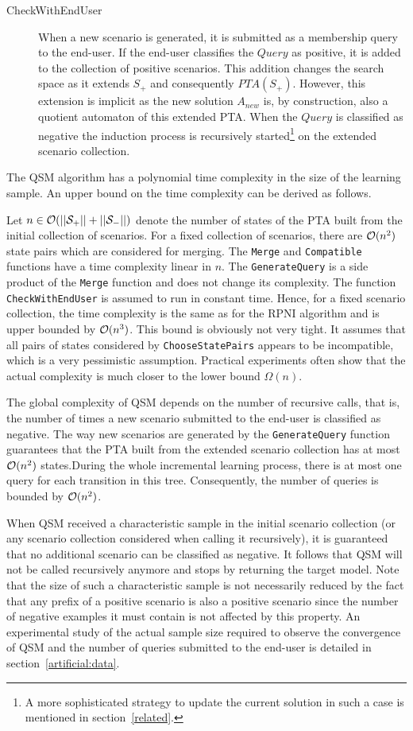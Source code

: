\begin{description}
\item[CheckWithEndUser] When a new scenario is generated, it is submitted as a membership query to the end-user. If the end-user classifies the $Query$ as positive, it is added to the collection of positive scenarios. This addition changes the search space as it extends $S_+$ and consequently $PTA(S_+)$. However, this extension is implicit as the new solution $A_{new}$ is, by construction, also a quotient automaton of this extended PTA. When the $Query$ is classified as negative the induction process is recursively started\footnote{A more sophisticated strategy to update the current solution in such a case is mentioned in section~\ref{related}.} on the extended scenario collection.
\end{description}

The QSM algorithm has a polynomial time complexity in the size of the learning sample. An upper bound on the time complexity can be derived as follows.

Let $n\in \cal{O}(||S_+||+||S_-||)$ denote the number of states of the PTA built from the initial collection of scenarios. For a fixed collection of scenarios, there are ${\cal O}(n^2)$ state pairs which are considered for merging. The \texttt{Merge} and \texttt{Compatible} functions have a time complexity linear in $n$. The \texttt{GenerateQuery} is a side product of the \texttt{Merge} function and does not change its complexity. The function \texttt{CheckWithEndUser} is assumed to run in constant time. Hence, for a fixed scenario collection, the time complexity is the same as for the RPNI algorithm and is upper bounded by ${\cal O}(n^3)$. This bound is obviously not very tight. It assumes that all pairs of states considered by \texttt{ChooseStatePairs} appears to be incompatible, which is a very pessimistic assumption. Practical experiments often show that the actual complexity is much closer to the lower bound $\Omega(n)$. 

The global complexity of QSM depends on the number of recursive calls, that is, the number of times a new scenario submitted to the end-user is classified as negative. The way new scenarios are generated by the \texttt{GenerateQuery} function guarantees that the PTA built from the extended scenario collection has at most ${\cal O}(n^2)$ states.During the whole incremental learning process, there is at most one query for each transition in this tree. Consequently, the number of queries is bounded by ${\cal O}(n^2)$.

When QSM received a characteristic sample in the initial scenario collection (or any scenario collection considered when calling it recursively), it is guaranteed that no additional scenario can be classified as negative. It follows that QSM will not be called recursively anymore and stops by returning the target model. Note that the size of such a characteristic sample is not necessarily reduced by the fact that any prefix of a positive scenario is also a positive scenario since the number of negative examples it must contain is not affected by this property. An experimental study of the actual sample size required to observe the convergence of \textsc{QSM} and the number of queries submitted to the end-user is detailed in section~\ref{artificial:data}.

